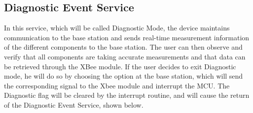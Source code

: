 \subsection{Diagnostic Event Service}
In this service, which will be called Diagnostic Mode, the device maintains communication to the base station and sends real-time measurement information of the different components to the base station. The user can then observe and verify that all components are taking accurate measurements and that data can be retrieved through the XBee module. If the user decides to exit Diagnostic mode, he will do so by choosing the option at the base station, which will send the corresponding signal to the Xbee module and interrupt the MCU. The Diagnostic flag will be cleared by the interrupt routine, and will cause the return of the Diagnostic Event Service, shown below.
